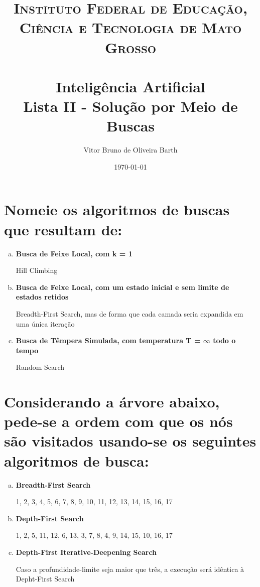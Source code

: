 \documentclass[paper=a4, fontsize=11pt]{scrartcl} %
\title{	
    \normalfont \normalsize 
    \textsc{Instituto Federal de Educação, Ciência e Tecnologia de Mato Grosso} \\ [25pt] %
    \horrule{0.5pt} \\[0.4cm] %
    \huge Inteligência Artificial \\ %
    \huge Lista II - Solução por Meio de Buscas
    \horrule{2pt} \\[0.5cm] %
    }
\author{Vitor Bruno de Oliveira Barth} %
\date{\normalsize\today} %
\begin{document}
    
    \maketitle
    
    
    \section{Nomeie os algoritmos de buscas que resultam de:}
    \begin{enumerate}[(a)]
        \item \textbf{Busca de Feixe Local, com k = 1}
        \par Hill Climbing

        \item \textbf{Busca de Feixe Local, com um estado inicial e sem limite de estados retidos}
        \par Breadth-First Search, mas de forma que cada camada seria expandida em uma única iteração

        \item \textbf{Busca de Têmpera Simulada, com temperatura T = $\infty$ todo o tempo}
        \par Random Search
    \end{enumerate}

    
    \section{Considerando a árvore abaixo, pede-se a ordem com que os nós são visitados usando-se os seguintes algoritmos de busca:}
    

    \begin{enumerate}[(a)]
        \item \textbf{Breadth-First Search}
        \par 1, 2, 3, 4, 5, 6, 7, 8, 9, 10, 11, 12, 13, 14, 15, 16, 17

        \item \textbf{Depth-First Search}
        \par 1, 2, 5, 11, 12, 6, 13, 3, 7, 8, 4, 9, 14, 15, 10, 16, 17

        \item \textbf{Depth-First Iterative-Deepening Search}
        \par Caso a profundidade-limite seja maior que três, a execução será idêntica à Depht-First Search 
    \end{enumerate}
\end{document}
